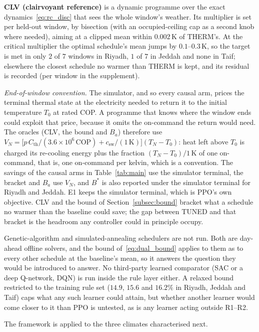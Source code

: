 \documentclass[pdflatex,sn-mathphys-num,iicol]{sn-jnl}
\theoremstyle{thmstyleone}\newtheorem{proposition}{Proposition}\newtheorem{corollary}{Corollary}
\theoremstyle{thmstyletwo}\newtheorem{remark}{Remark}\newtheorem{observation}{Observation}
\theoremstyle{thmstylethree}\newtheorem{definition}{Definition}
\newcommand{\Cth}{C_{\mathrm{th}}}
\newcommand{\csw}{c_{\mathrm{sw}}}
\begin{document}
\textbf{CLV (clairvoyant reference)} is a dynamic programme over the exact dynamics~\eqref{eq:rc_disc} that sees the whole window's weather. Its multiplier is set per held-out window, by bisection (with an occupied-ceiling cap as a second knob where needed), aiming at a clipped mean within $0.002\,$K of THERM's. At the critical multiplier the optimal schedule's mean jumps by $0.1$--$0.3\,$K, so the target is met in only $2$ of $7$ windows in Riyadh, $1$ of $7$ in Jeddah and none in Taif; elsewhere the closest schedule no warmer than THERM is kept, and its residual is recorded (per window in the supplement).

\emph{End-of-window convention.} The simulator, and so every causal arm, prices the terminal thermal state at the electricity needed to return it to the initial temperature $T_0$ at rated COP. A programme that knows where the window ends could exploit that price, because it omits the on-command the return would need. The oracles (CLV, the bound and $B_a$) therefore use $V_N=\bigl[p\,\Cth/(3.6\times10^{6}\,\mathrm{COP})+\csw/(1\,\mathrm{K})\bigr](T_N-T_0)$: heat left above $T_0$ is charged its re-cooling energy plus the fraction $(T_N-T_0)/1\,$K of one on-command, that is, one on-command per kelvin, which is a convention. The savings of the causal arms in Table~\ref{tab:main} use the simulator terminal, the bracket and $B_a$ use $V_N$, and $B^\ast$ is also reported under the simulator terminal for Riyadh and Jeddah. E1 keeps the simulator terminal, which is PPO's own objective. CLV and the bound of Section~\ref{subsec:bound} bracket what a schedule no warmer than the baseline could save; the gap between TUNED and that bracket is the headroom any controller could in principle occupy.

Genetic-algorithm and simulated-annealing schedulers \citep{ElMakroum2023,Bandarra2025} are not run. Both are day-ahead offline solvers, and the bound of~\eqref{eq:dual_bound} applies to them as to every other schedule at the baseline's mean, so it answers the question they would be introduced to answer. No third-party learned comparator (SAC or a deep Q-network, DQN) is run inside the rule layer either. A relaxed bound restricted to the training rule set ($14.9$, $15.6$ and $16.2\%$ in Riyadh, Jeddah and Taif) caps what any such learner could attain, but whether another learner would come closer to it than PPO is untested, as is any learner acting outside R1--R2.
 
The framework is applied to the three climates characterised next.
 
\end{document}
